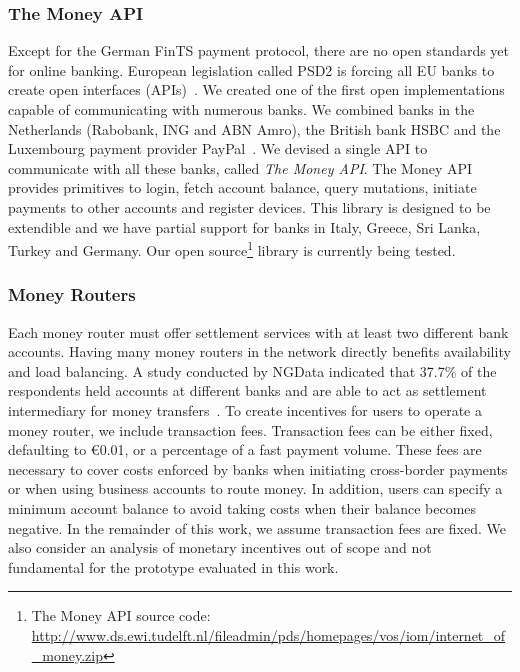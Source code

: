 \subsubsection*{The Money API}
Except for the German FinTS payment protocol, there are no open standards yet for online banking.
European legislation called PSD2 is forcing all EU banks to create open interfaces (APIs)~\cite{cortet2016psd2}.
We created one of the first open implementations capable of communicating with numerous banks. %
We combined banks in the Netherlands (Rabobank, ING and ABN Amro), the British bank HSBC and the Luxembourg payment provider PayPal~\cite{doe2015vulnerability,awesome2015vulnerability}.
We devised a single API to communicate with all these banks, called \emph{The Money API}.
The Money API provides primitives to login, fetch account balance, query mutations, initiate payments to other accounts and register devices.
This library is designed to be extendible and we have partial support for banks in Italy, Greece, Sri Lanka, Turkey and Germany.
Our open source\footnote{The Money API source code: \url{http://www.ds.ewi.tudelft.nl/fileadmin/pds/homepages/vos/iom/internet\_of\_money.zip}} library is currently being tested.


\subsubsection*{Money Routers}
Each money router must offer settlement services with at least two different bank accounts.
Having many money routers in the network directly benefits availability and load balancing.
A study conducted by NGData indicated that 37.7\% of the respondents held accounts at different banks and are able to act as settlement intermediary for money transfers~\cite{ngdata2014consumer}.
To create incentives for users to operate a money router, we include transaction fees.
Transaction fees can be either fixed, defaulting to \euro 0.01, or a percentage of a fast payment volume.
These fees are necessary to cover costs enforced by banks when initiating cross-border payments or when using business accounts to route money.
In addition, users can specify a minimum account balance to avoid taking costs when their balance becomes negative.
In the remainder of this work, we assume transaction fees are fixed.
We also consider an analysis of monetary incentives out of scope and not fundamental for the prototype evaluated in this work.


